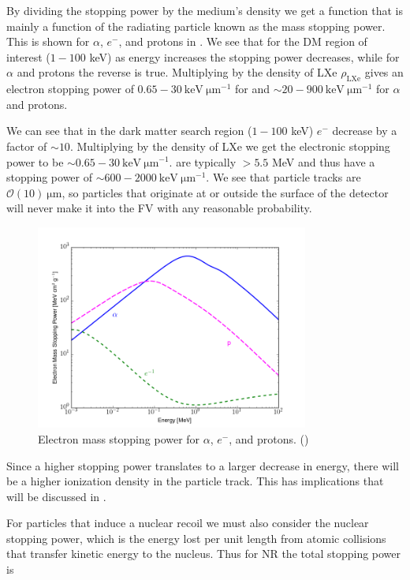 By dividing the stopping power by the medium's density we get a function that is mainly a function of the radiating particle known as
the mass stopping power.  This is shown for $\alpha$, $e^{-}$, and protons in .  We see that for the DM
region of interest ($1-100$ keV) as \electron
energy increases the stopping power decreases, while for $\alpha$ and protons the reverse is true.  Multiplying by the density of LXe
$\rho_{\mathrm{LXe}}$ gives an electron stopping power of $0.65-30\ \mathrm{keV\ \mu m^{-1}}$ for \electron and
$\sim 20-900\ \mathrm{keV\ \mu m^{-1}}$ for $\alpha$ and protons.

We can see that in
the dark matter search region ($1-100$ keV) $e^{-}$ decrease by a factor of $\sim 10$.  Multiplying by the density of LXe we get the
electronic stopping power to be $\sim 0.65-30\ \mathrm{keV\ \mu m^{-1}}$.  \alphadecays are typically $> 5.5$ MeV and thus have a stopping
power of $\sim 600-2000\ \mathrm{keV\ \mu m^{-1}}$.  We see that particle tracks are $\mathcal{O}(10)\ \mathrm{\mu m}$, so particles
that originate at or outside the surface of the detector will never make it into the FV with any reasonable probability.

\begin{figure}[t]
\includegraphics[width=0.8\textwidth]{MassStoppingPower}
\caption{Electron mass stopping power for $\alpha$, $e^{-}$, and protons.  ()}
\label{fig:mass_stopping_power}
\end{figure}

Since a higher stopping power translates to a larger decrease in energy, there will be a higher ionization density in the particle
track.  This has implications that will be discussed in \secref{}.

For particles that induce a nuclear recoil we must also consider the nuclear stopping power, which is the energy lost per unit length from
atomic collisions that transfer kinetic energy to the nucleus.  Thus for NR the total stopping power is

